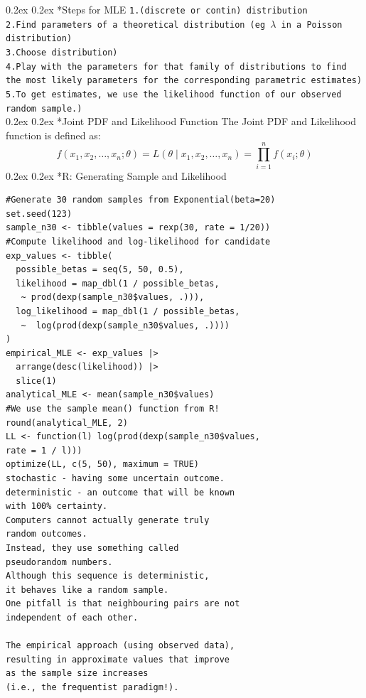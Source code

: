 \documentclass[8pt,landscape]{article}
\makeatletter
\renewcommand{\subsection}{\@startsection{subsection}{2}{0pt}%
    {0.2ex}%
    {0.2ex}%
    {\fontsize{8}{8}\bfseries}} %
\makeatother
\begin{document}
\begin{multicols}{3}
\subsection*{Steps for MLE}
\texttt{1.(discrete or contin) distribution} \\
\texttt{2.Find parameters of a theoretical distribution (eg $\lambda$ in a Poisson distribution)} \\
\texttt{3.Choose distribution)} \\
\texttt{4.Play with the parameters for that family of distributions to find the most likely parameters for the corresponding parametric estimates)} \\
\texttt{5.To get estimates, we use the likelihood function of our observed random sample.)} \\
\subsection*{Joint PDF and Likelihood Function}
The Joint PDF and Likelihood function is defined as:
\[
f(x_1, x_2, \dots, x_n;\theta) = L(\theta \mid x_1, x_2, \dots, x_n) = \prod_{i=1}^n f(x_i;\theta)
\]
\subsection*{R: Generating Sample and Likelihood}
\begin{verbatim}
#Generate 30 random samples from Exponential(beta=20)
set.seed(123)
sample_n30 <- tibble(values = rexp(30, rate = 1/20))
#Compute likelihood and log-likelihood for candidate
exp_values <- tibble(
  possible_betas = seq(5, 50, 0.5),
  likelihood = map_dbl(1 / possible_betas, 
   ~ prod(dexp(sample_n30$values, .))),
  log_likelihood = map_dbl(1 / possible_betas, 
   ~  log(prod(dexp(sample_n30$values, .))))
)
empirical_MLE <- exp_values |>
  arrange(desc(likelihood)) |>
  slice(1)
analytical_MLE <- mean(sample_n30$values) 
#We use the sample mean() function from R!
round(analytical_MLE, 2)
LL <- function(l) log(prod(dexp(sample_n30$values,
rate = 1 / l)))
optimize(LL, c(5, 50), maximum = TRUE)
stochastic - having some uncertain outcome. 
deterministic - an outcome that will be known 
with 100% certainty.
Computers cannot actually generate truly 
random outcomes. 
Instead, they use something called 
pseudorandom numbers.
Although this sequence is deterministic, 
it behaves like a random sample. 
One pitfall is that neighbouring pairs are not 
independent of each other.

The empirical approach (using observed data),
resulting in approximate values that improve 
as the sample size increases 
(i.e., the frequentist paradigm!).


\end{verbatim}
\end{multicols}
\end{document}
